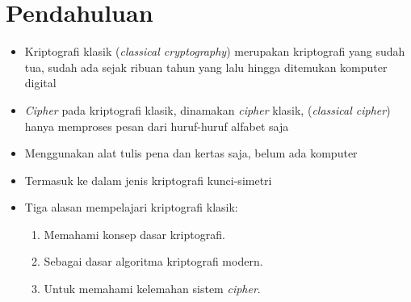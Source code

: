 \documentclass{article}
\begin{document}

\section*{Pendahuluan}

\begin{itemize}
    \item Kriptografi klasik (\textit{classical cryptography}) merupakan kriptografi yang sudah tua, sudah ada sejak ribuan tahun yang lalu hingga ditemukan komputer digital
    \item \textit{Cipher} pada kriptografi klasik, dinamakan \textit{cipher} klasik, (\textit{classical cipher}) hanya memproses pesan dari huruf-huruf alfabet saja
    \item Menggunakan alat tulis pena dan kertas saja, belum ada komputer
    \item Termasuk ke dalam jenis kriptografi kunci-simetri
\end{itemize}

\begin{itemize}
    \item Tiga alasan mempelajari kriptografi klasik:
    \begin{enumerate}
        \item Memahami konsep dasar kriptografi.
        \item Sebagai dasar algoritma kriptografi modern.
        \item Untuk memahami kelemahan sistem \textit{cipher}.
    \end{enumerate}
\end{itemize}
\end{document}

